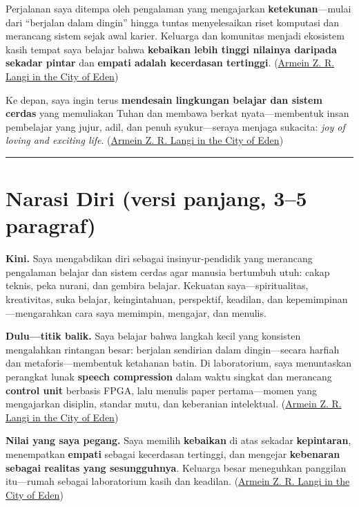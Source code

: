 \documentclass[
  letterpaper,
  DIV=11,
  numbers=noendperiod]{scrreprt}
\begin{document}
Perjalanan saya ditempa oleh pengalaman yang mengajarkan
\textbf{ketekunan}---mulai dari ``berjalan dalam dingin'' hingga tuntas
menyelesaikan riset komputasi dan merancang sistem sejak awal karier.
Keluarga dan komunitas menjadi ekosistem kasih tempat saya belajar bahwa
\textbf{kebaikan lebih tinggi nilainya daripada sekadar pintar} dan
\textbf{empati adalah kecerdasan tertinggi}.
(\href{https://ii-2100.github.io/all-about-me/My_Stories_for_You/index.html}{Armein
Z. R. Langi in the City of Eden})

Ke depan, saya ingin terus \textbf{mendesain lingkungan belajar dan
sistem cerdas} yang memuliakan Tuhan dan membawa berkat
nyata---membentuk insan pembelajar yang jujur, adil, dan penuh
syukur---seraya menjaga sukacita: \emph{joy of loving and exciting
life}.
(\href{https://ii-2100.github.io/all-about-me/My_Stories_for_You/index.html}{Armein
Z. R. Langi in the City of Eden})

\begin{center}\rule{0.5\linewidth}{0.5pt}\end{center}

\section{Narasi Diri (versi panjang, 3--5
paragraf)}\label{narasi-diri-versi-panjang-35-paragraf}

\textbf{Kini.} Saya mengabdikan diri sebagai insinyur-pendidik yang
merancang pengalaman belajar dan sistem cerdas agar manusia bertumbuh
utuh: cakap teknis, peka nurani, dan gembira belajar. Kekuatan
saya---spiritualitas, kreativitas, suka belajar, keingintahuan,
perspektif, keadilan, dan kepemimpinan---mengarahkan cara saya memimpin,
mengajar, dan menulis.

\textbf{Dulu---titik balik.} Saya belajar bahwa langkah kecil yang
konsisten mengalahkan rintangan besar: berjalan sendirian dalam
dingin---secara harfiah dan metaforis---membentuk ketahanan batin. Di
laboratorium, saya menuntaskan perangkat lunak \textbf{speech
compression} dalam waktu singkat dan merancang \textbf{control unit}
berbasis FPGA, lalu menulis paper pertama---momen yang mengajarkan
disiplin, standar mutu, dan keberanian intelektual.
(\href{https://ii-2100.github.io/all-about-me/My_Stories_for_You/index.html}{Armein
Z. R. Langi in the City of Eden})

\textbf{Nilai yang saya pegang.} Saya memilih \textbf{kebaikan} di atas
sekadar \textbf{kepintaran}, menempatkan \textbf{empati} sebagai
kecerdasan tertinggi, dan mengejar \textbf{kebenaran sebagai realitas
yang sesungguhnya}. Keluarga besar meneguhkan panggilan itu---rumah
sebagai laboratorium kasih dan keadilan.
(\href{https://azrl.wordpress.com/2010/01/09/on-being-nice/?utm_source=chatgpt.com}{Armein
Z. R. Langi in the City of Eden})
\end{document}
